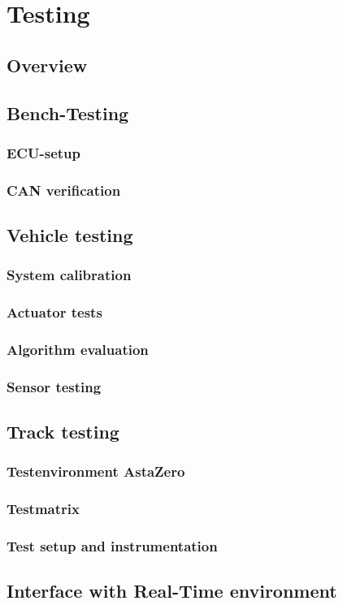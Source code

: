 \documentclass[ExampleMasters.tex]{subfiles}
\begin{document}
\clearpage
\chapter{Testing}


\section{Overview}



\section{Bench-Testing}
\subsection{ECU-setup}
\subsection{CAN verification}


\section{Vehicle testing}
\subsection{System calibration}
\subsection{Actuator tests}
\subsection{Algorithm evaluation}
\subsection{Sensor testing}


\section{Track testing}

\subsection{Testenvironment AstaZero}
\subsection{Testmatrix}
\subsection{Test setup and instrumentation}


\section{Interface with Real-Time environment}
\end{document}
